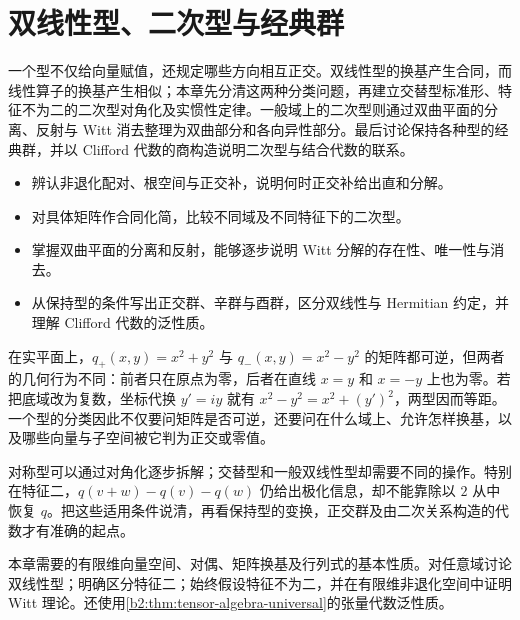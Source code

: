 
\chapter{双线性型、二次型与经典群}
\label{b2:ch:10}

\begin{chapterabstract}
	一个型不仅给向量赋值，还规定哪些方向相互正交。双线性型的换基产生合同，而线性算子的换基产生相似；本章先分清这两种分类问题，再建立交替型标准形、特征不为二的二次型对角化及实惯性定律。一般域上的二次型则通过双曲平面的分离、反射与 Witt 消去整理为双曲部分和各向异性部分。最后讨论保持各种型的经典群，并以 Clifford 代数的商构造说明二次型与结合代数的联系。
\end{chapterabstract}

\begin{learninggoals}
	\begin{itemize}
		\item 辨认非退化配对、根空间与正交补，说明何时正交补给出直和分解。
		\item 对具体矩阵作合同化简，比较不同域及不同特征下的二次型。
		\item 掌握双曲平面的分离和反射，能够逐步说明 Witt 分解的存在性、唯一性与消去。
		\item 从保持型的条件写出正交群、辛群与酉群，区分双线性与 Hermitian 约定，并理解 Clifford 代数的泛性质。
	\end{itemize}
\end{learninggoals}

在实平面上，\(q_+(x,y)=x^2+y^2\) 与 \(q_-(x,y)=x^2-y^2\) 的矩阵都可逆，但两者的几何行为不同：前者只在原点为零，后者在直线 \(x=y\) 和 \(x=-y\) 上也为零。若把底域改为复数，坐标代换 \(y'=iy\) 就有 \(x^2-y^2=x^2+(y')^2\)，两型因而等距。一个型的分类因此不仅要问矩阵是否可逆，还要问在什么域上、允许怎样换基，以及哪些向量与子空间被它判为正交或零值。

\ProseParagraphBreak

对称型可以通过对角化逐步拆解；交替型和一般双线性型却需要不同的操作。特别在特征二，\(q(v+w)-q(v)-q(w)\) 仍给出极化信息，却不能靠除以 \(2\) 从中恢复 \(q\)。把这些适用条件说清，再看保持型的变换，正交群及由二次关系构造的代数才有准确的起点。

\ProseParagraphBreak

本章需要的有限维向量空间、对偶、矩阵换基及行列式的基本性质。对任意域讨论双线性型；明确区分特征二；始终假设特征不为二，并在有限维非退化空间中证明 Witt 理论。还使用\cref{b2:thm:tensor-algebra-universal}的张量代数泛性质。

